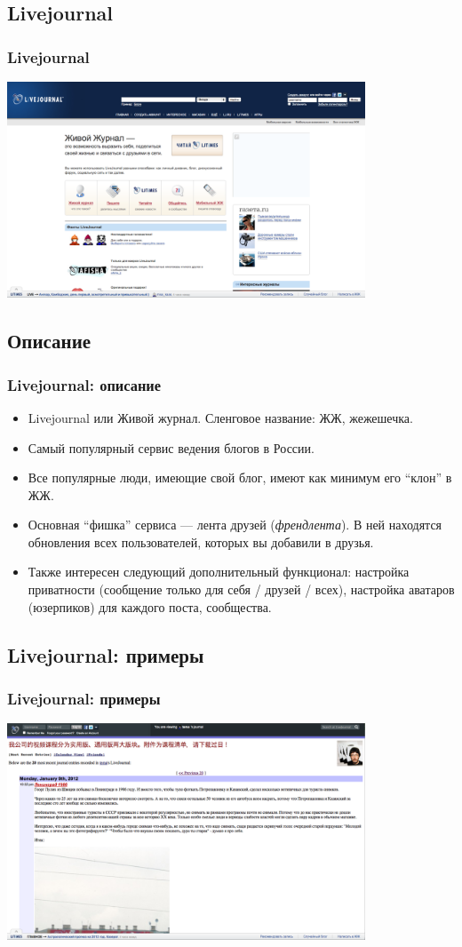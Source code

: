 \documentclass[compress,red]{beamer}
\begin{document}
\subsection{Livejournal}
\begin{frame}
  \frametitle{Livejournal}
	\centerline{\includegraphics[width=0.8\textwidth]{images/livejournal.png}}
\end{frame}

\subsection{Описание}
\begin{frame}[fragile]
\frametitle{Livejournal: описание}
		\begin{itemize}
		\item Livejournal или Живой журнал. Сленговое название: ЖЖ, жежешечка.
		\item Самый популярный сервис ведения блогов в России.
		\item Все популярные люди, имеющие свой блог, имеют как минимум его ``клон'' в ЖЖ.
		\item Основная ``фишка'' сервиса --- лента друзей (\emph{френдлента}). В ней находятся обновления всех пользователей, которых вы добавили в друзья.
		\item Также интересен следующий дополнительный функционал: настройка приватности (сообщение только для себя / друзей / всех), настройка аватаров (юзерпиков) для каждого поста, сообщества.
		\end{itemize}
\end{frame}

\subsection{Livejournal: примеры}
\begin{frame}
  \frametitle{Livejournal: примеры}
	\centerline{\includegraphics[width=0.8\textwidth]{images/tema-lj.png}}
\end{frame}
\end{document}
